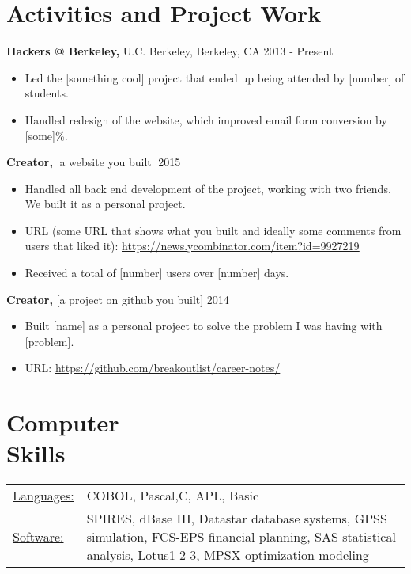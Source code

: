 \documentclass[margin]{res}
\begin{document}
\begin{resume}
\section{Activities and Project Work} 
               {\bf Hackers @ Berkeley,} U.C. Berkeley, Berkeley, CA    \hfill         2013 - Present 
                \begin{itemize} \itemsep -2pt
              \item Led the [something cool] project that ended up being attended by [number] of students.
                 
                \item  Handled redesign of the website, which improved email form conversion by [some]\%. 

		 \end{itemize}

		{\bf Creator,} [a website you built] \hfill   2015 
                \begin{itemize} \itemsep -2pt
                 \item  Handled all back end development of the project, working with two friends. We built it as a personal project.
                
                 \item URL (some URL that shows what you built and ideally some comments from users that liked it): \underline{\url{https://news.ycombinator.com/item?id=9927219}}
                
                 \item Received a total of [number] users over [number] days. 
		 \end{itemize}

                  {\bf  Creator,}  [a project on github you built]    \hfill                                 2014 
                 \begin{itemize} \itemsep -2pt

               \item    Built [name] as a personal project to solve the problem I was having with [problem].
                 
               \item  URL: \underline{\url{https://github.com/breakoutlist/career-notes/}}
		 \end{itemize}

\section{Computer \\ Skills}
   \begin{tabular}{l p{3in}}
    \underline{Languages:} & COBOL, Pascal,C, APL, Basic \\

     \underline{Software:} &  SPIRES, dBase III, Datastar database 
                        systems, GPSS simulation, FCS-EPS financial 
                        planning, SAS statistical analysis, 
                        Lotus1-2-3, MPSX optimization modeling 
 \end{tabular}

\end{resume} 
\end{document}
